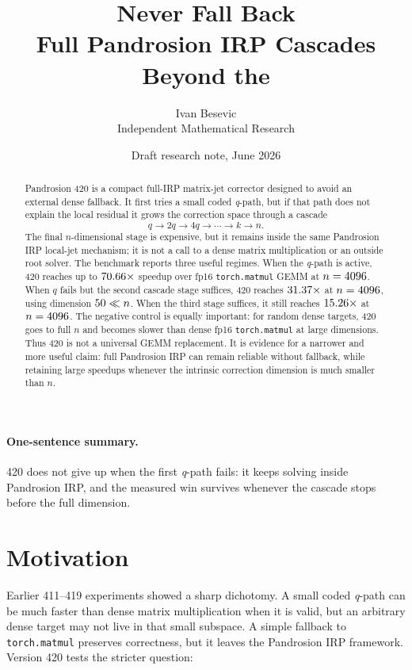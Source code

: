 \documentclass[11pt]{article}
\title{\textbf{Never Fall Back}\\[-1mm]
\large Full Pandrosion IRP Cascades Beyond the \qpath}
\author{Ivan Besevic\\Independent Mathematical Research}
\date{Draft research note, June 2026}
\newcommand{\qpath}{\textit{q}\nobreakdash-path}
\newcommand{\matmul}{\texttt{torch.matmul}}
\begin{document}
\maketitle

\begin{abstract}
Pandrosion 420 is a compact full-IRP matrix-jet corrector designed to avoid an
external dense fallback.  It first tries a small coded \qpath, but if that path
does not explain the local residual it grows the correction space through a
cascade
\[
        q \rightarrow 2q \rightarrow 4q \rightarrow \cdots \rightarrow k
        \rightarrow n.
\]
The final \(n\)-dimensional stage is expensive, but it remains inside the same
Pandrosion IRP local-jet mechanism; it is not a call to a dense matrix
multiplication or an outside root solver.  The benchmark reports three useful
regimes.  When the \qpath{} is active, 420 reaches up to
\(70.66\times\) speedup over fp16 \matmul{} GEMM at \(n=4096\).
When \(q\) fails but the second cascade stage suffices, 420 reaches
\(31.37\times\) at \(n=4096\), using dimension
\(50\ll n\).  When the third stage suffices, it still reaches
\(15.26\times\) at \(n=4096\).  The negative control is
equally important: for random dense targets, 420 goes to full \(n\) and becomes
slower than dense fp16 \matmul{} at large dimensions.  Thus 420 is not a
universal GEMM replacement.  It is evidence for a narrower and more useful
claim: full Pandrosion IRP can remain reliable without fallback, while retaining
large speedups whenever the intrinsic correction dimension is much smaller than
\(n\).
\end{abstract}

\paragraph{One-sentence summary.}
420 does not give up when the first \qpath{} fails: it keeps solving inside
Pandrosion IRP, and the measured win survives whenever the cascade stops before
the full dimension.

\section{Motivation}

Earlier 411--419 experiments showed a sharp dichotomy.  A small coded
\qpath{} can be much faster than dense matrix multiplication when it is valid,
but an arbitrary dense target may not live in that small subspace.  A simple
fallback to \matmul{} preserves correctness, but it leaves the Pandrosion IRP
framework.  Version 420 tests the stricter question:
\end{document}
